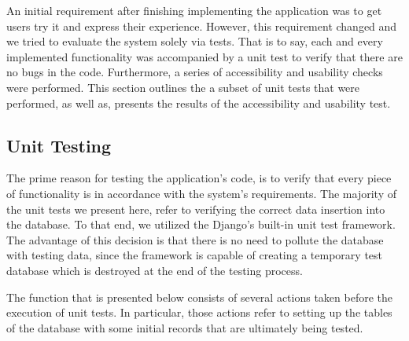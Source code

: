 An initial requirement after finishing implementing the application was to get users try it and express their experience. However, this requirement changed and we tried to evaluate the system solely via tests. That is to say, each and every implemented functionality was accompanied by a unit test to verify that there are no bugs in the code. Furthermore, a series of accessibility and usability checks were performed. This section outlines the a subset of unit tests that were performed, as well as, presents the results of the accessibility and usability test.

\subsection{Unit Testing}

The prime reason for testing the application's code, is to verify that every piece of functionality is in accordance with the system's requirements. The majority of the unit tests we present here, refer to verifying the correct data insertion into the database. To that end, we utilized the Django's built-in unit test framework. The advantage of this decision is that there is no need to pollute the database with testing data, since the framework is capable of creating a temporary test database which is destroyed at the end of the testing process.

The function that is presented below consists of several actions taken before the execution of unit tests. In particular, those actions refer to setting up the tables of the database with some initial records that are ultimately being tested.

